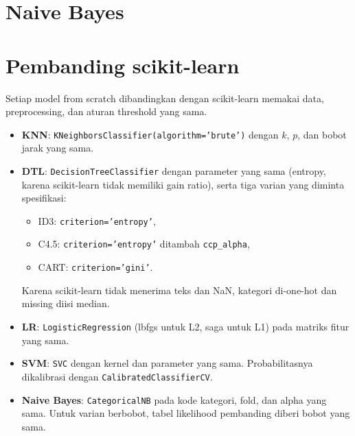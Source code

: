 \endgroup
\section{Naive Bayes}


\section{Pembanding scikit-learn}
Setiap model from scratch dibandingkan dengan scikit-learn \cite{ref:sklearn} memakai data, preprocessing, dan aturan threshold yang sama.
\begin{itemize}
  \item \textbf{KNN}: \texttt{KNeighborsClassifier(algorithm='brute')} dengan $k$, $p$, dan bobot jarak yang sama.
  \item \textbf{DTL}: \texttt{DecisionTreeClassifier} dengan parameter yang sama (entropy, karena scikit-learn tidak memiliki gain ratio), serta tiga varian yang diminta spesifikasi:
  \begin{itemize}
    \item ID3: \texttt{criterion='entropy'},
    \item C4.5: \texttt{criterion='entropy'} ditambah \texttt{ccp\_alpha},
    \item CART: \texttt{criterion='gini'}.
  \end{itemize}
  Karena scikit-learn tidak menerima teks dan NaN, kategori di-one-hot dan missing diisi median.
  \item \textbf{LR}: \texttt{LogisticRegression} (lbfgs untuk L2, saga untuk L1) pada matriks fitur yang sama.
  \item \textbf{SVM}: \texttt{SVC} dengan kernel dan parameter yang sama. Probabilitasnya dikalibrasi dengan \texttt{CalibratedClassifier\-CV}.
  \item \textbf{Naive Bayes}: \texttt{CategoricalNB} pada kode kategori, fold, dan alpha yang sama. Untuk varian berbobot, tabel likelihood pembanding diberi bobot yang sama.
\end{itemize}
